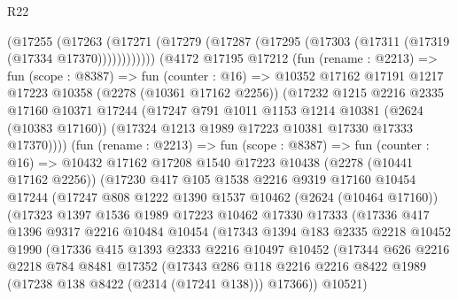 \begin{lexlean}{R22}
\begin{coremodule}
          (@17255
            (@17263
              (@17271 (@17279 (@17287 (@17295 (@17303 (@17311 (@17319 (@17334 @17370))))))))))))
      (@4172
        @17195
        @17212
        (fun (rename : @2213) =>
        fun (scope : @8387) =>
        fun (counter : @16) =>
        @10352
          @17162
          @17191
          @1217
          @17223
          @10358
          (@2278 (@10361 @17162 @2256))
          (@17232
            @1215
            @2216
            @2335
            @17160
            @10371
            @17244
            (@17247
              @791
              @1011
              @1153
              @1214
              @10381
              (@2624 (@10383 @17160))
              (@17324 @1213 @1989 @17223 @10381 @17330 @17333 @17370))))
        (fun (rename : @2213) =>
        fun (scope : @8387) =>
        fun (counter : @16) =>
        @10432
          @17162
          @17208
          @1540
          @17223
          @10438
          (@2278 (@10441 @17162 @2256))
          (@17230
            @417
            @105
            @1538
            @2216
            @9319
            @17160
            @10454
            @17244
            (@17247
              @808
              @1222
              @1390
              @1537
              @10462
              (@2624 (@10464 @17160))
              (@17323
                @1397
                @1536
                @1989
                @17223
                @10462
                @17330
                @17333
                (@17336
                  @417
                  @1396
                  @9317
                  @2216
                  @10484
                  @10454
                  (@17343
                    @1394
                    @183
                    @2335
                    @2218
                    @10452
                    @1990
                    (@17336
                      @415
                      @1393
                      @2333
                      @2216
                      @10497
                      @10452
                      (@17344
                        @626
                        @2216
                        @2218
                        @784
                        @8481
                        @17352
                        (@17343
                          @286
                          @118
                          @2216
                          @2216
                          @8422
                          @1989
                          (@17238 @138 @8422 (@2314 (@17241 @138)))
                          @17366))
                      @10521)

\end{coremodule}
\end{lexlean}
